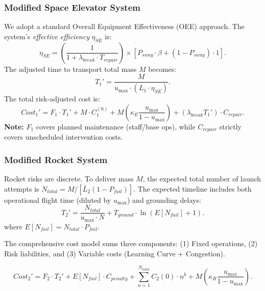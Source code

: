 \documentclass{mcmthesis}
\begin{document}
\subsubsection{Modified Space Elevator System}
We adopt a standard Overall Equipment Effectiveness (OEE) approach. The system's \emph{effective efficiency} $\eta_{SE}$ is:
\begin{equation}
    \eta_{SE} = \left( \frac{1}{1 + \lambda_{break} \cdot T_{repair}} \right) \times \left[ P_{sway} \cdot \beta + (1 - P_{sway}) \cdot 1 \right].
\end{equation}
The adjusted time to transport total mass $M$ becomes:
\begin{equation}
    T_1' = \frac{M}{u_{\max} \cdot (L_1 \cdot \eta_{SE})}.
\end{equation}
The total risk-adjusted cost is:
\begin{equation}
    Cost_1' = F_1 \cdot T_1' + M \cdot C_1^{(0)} + M \left( \kappa_E \frac{u_{\max}}{1-u_{\max}} \right) + (\lambda_{break} T_1') \cdot C_{repair}.
\end{equation}
\textbf{Note:} $F_1$ covers planned maintenance (staff/base ops), while $C_{repair}$ strictly covers unscheduled intervention costs.

\subsubsection{Modified Rocket System}
Rocket risks are discrete. To deliver mass $M$, the expected total number of launch attempts is $N_{total} = M / [\bar{L}_2 (1 - P_{fail})]$.
The expected timeline includes both operational flight time (diluted by $u_{\max}$) and grounding delays:
\begin{equation}
    T_2' = \frac{N_{total}}{u_{\max} \cdot N} + T_{ground} \cdot \ln(E[N_{fail}] + 1).
\end{equation}
where $E[N_{fail}] = N_{total} \cdot P_{fail}$.

The comprehensive cost model sums three components: (1) Fixed operations, (2) Risk liabilities, and (3) Variable costs (Learning Curve + Congestion).

\begin{equation}
    Cost_2' = F_2 \cdot T_2' + E[N_{fail}] \cdot C_{penalty} + \sum_{n=1}^{N_{total}} C_2(0)\cdot n^b + M \left( \kappa_R \frac{u_{\max}}{1-u_{\max}} \right).
\end{equation}
\end{document}

